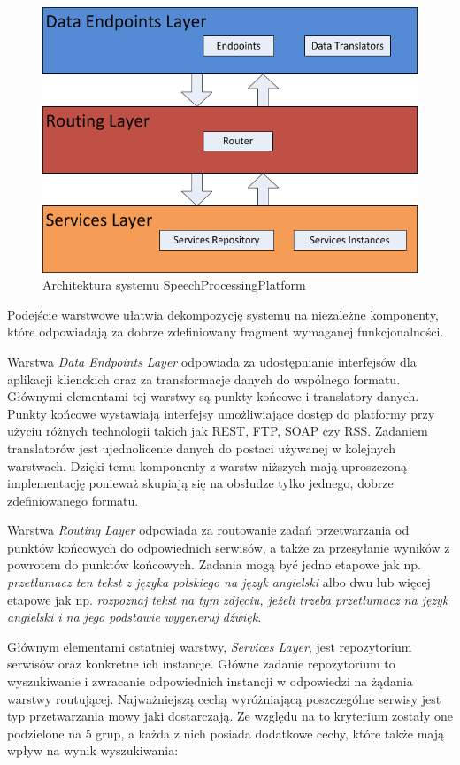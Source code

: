 \begin{figure}[!h]
	\centering
	\includegraphics[scale=0.7]{layered_architecture.png}
	\caption{Architektura systemu SpeechProcessingPlatform}\label{fig:layered_architecture}
\end{figure}

Podejście warstwowe ułatwia dekompozycję systemu na niezależne komponenty, które odpowiadają za dobrze zdefiniowany fragment wymaganej funkcjonalności. 

Warstwa \textit{Data Endpoints Layer} odpowiada za udostępnianie interfejsów dla aplikacji klienckich oraz za transformacje danych do wspólnego formatu. Głównymi elementami tej warstwy są punkty końcowe i translatory danych. Punkty końcowe wystawiają interfejsy umożliwiające dostęp do platformy przy użyciu różnych technologii takich jak REST, FTP, SOAP czy RSS. Zadaniem translatorów jest ujednolicenie danych do postaci używanej w kolejnych warstwach. Dzięki temu komponenty z warstw niższych mają uproszczoną implementację ponieważ skupiają się na obsłudze tylko jednego, dobrze zdefiniowanego formatu. 

Warstwa \textit{Routing Layer} odpowiada za routowanie zadań przetwarzania od punktów końcowych do odpowiednich serwisów, a także za przesyłanie wyników z powrotem do punktów końcowych. Zadania mogą być jedno etapowe jak np. \textit{przetłumacz ten tekst z języka polskiego na język angielski} albo dwu lub więcej etapowe jak np. \textit{rozpoznaj tekst na tym zdjęciu, jeżeli trzeba przetłumacz na język angielski i na jego podstawie wygeneruj dźwięk}.

Głównym elementami ostatniej warstwy, \textit{Services Layer}, jest repozytorium serwisów oraz konkretne ich instancje. Główne zadanie repozytorium to wyszukiwanie i zwracanie odpowiednich instancji w odpowiedzi na żądania warstwy routującej. Najważniejszą cechą wyróżniającą poszczególne serwisy jest typ przetwarzania mowy jaki dostarczają. Ze względu na to kryterium zostały one podzielone na 5 grup, a każda z nich posiada dodatkowe cechy, które także mają wpływ na wynik wyszukiwania:

